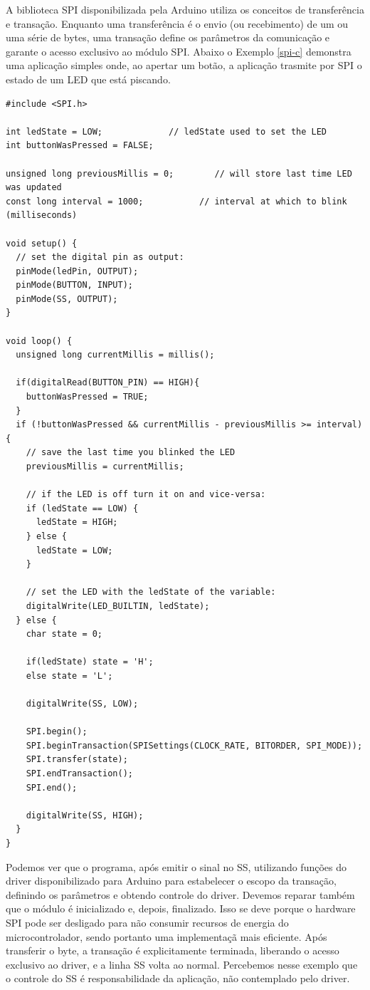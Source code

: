 \documentclass[11pt]{article}
\begin{document}
\par A biblioteca SPI disponibilizada pela Arduino utiliza os conceitos de transferência e transação. Enquanto uma transferência é o envio (ou recebimento) de um ou uma série de bytes, uma transação define os parâmetros da comunicação e garante o acesso exclusivo ao módulo SPI. Abaixo o Exemplo \ref{spi-c} demonstra uma aplicação simples onde, ao apertar um botão, a aplicação trasmite por SPI o estado de um LED que está piscando.
\begin{lstlisting}[style=CStyle,label=spi-c,caption=Aplicação em C utilizando driver SPI bloqueante]
#include <SPI.h>

int ledState = LOW;             // ledState used to set the LED
int buttonWasPressed = FALSE;

unsigned long previousMillis = 0;        // will store last time LED was updated
const long interval = 1000;           // interval at which to blink (milliseconds)

void setup() {
  // set the digital pin as output:
  pinMode(ledPin, OUTPUT);
  pinMode(BUTTON, INPUT);
  pinMode(SS, OUTPUT);
}

void loop() {
  unsigned long currentMillis = millis();

  if(digitalRead(BUTTON_PIN) == HIGH){
    buttonWasPressed = TRUE;
  }
  if (!buttonWasPressed && currentMillis - previousMillis >= interval) {
    // save the last time you blinked the LED
    previousMillis = currentMillis;

    // if the LED is off turn it on and vice-versa:
    if (ledState == LOW) {
      ledState = HIGH;
    } else {
      ledState = LOW;
    }

    // set the LED with the ledState of the variable:
    digitalWrite(LED_BUILTIN, ledState);
  } else {
    char state = 0;

    if(ledState) state = 'H';
    else state = 'L';

    digitalWrite(SS, LOW);

    SPI.begin();
    SPI.beginTransaction(SPISettings(CLOCK_RATE, BITORDER, SPI_MODE));
    SPI.transfer(state);
    SPI.endTransaction();
    SPI.end();

    digitalWrite(SS, HIGH);
  }
}
\end{lstlisting}
\par Podemos ver que o programa, após emitir o sinal no SS, utilizando funções do driver disponibilizado para Arduino para estabelecer o escopo da transação, definindo os parâmetros e obtendo controle do driver. Devemos reparar também que o módulo é inicializado e, depois, finalizado. Isso se deve porque o hardware SPI pode ser desligado para não consumir recursos de energia do microcontrolador, sendo portanto uma implementaçã mais eficiente. Após transferir o byte, a transação é explicitamente terminada, liberando o acesso exclusivo ao driver, e a linha SS volta ao normal. Percebemos nesse exemplo que o controle do SS é responsabilidade da aplicação, não contemplado pelo driver.
\end{document}
